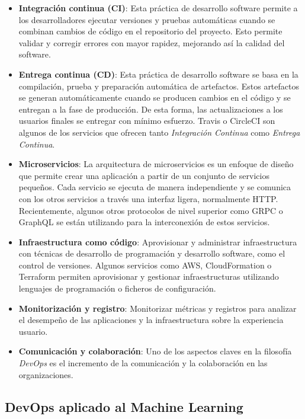 \documentclass[
  12pt,
  a4paperpaper,
]{report}
\begin{document}
\begin{itemize}
\item
  \textbf{Integración continua (CI)}: Esta práctica de desarrollo
  software permite a los desarrolladores ejecutar versiones y pruebas
  automáticas cuando se combinan cambios de código en el repositorio del
  proyecto. Esto permite validar y corregir errores con mayor rapidez,
  mejorando así la calidad del software.
\item
  \textbf{Entrega continua (CD)}: Esta práctica de desarrollo software
  se basa en la compilación, prueba y preparación automática de
  artefactos. Estos artefactos se generan automáticamente cuando se
  producen cambios en el código y se entregan a la fase de producción.
  De esta forma, las actualizaciones a los usuarios finales se entregar
  con mínimo esfuerzo. Travis o CircleCI son algunos de los servicios
  que ofrecen tanto \emph{Integración Continua} como \emph{Entrega
  Continua}.
\item
  \textbf{Microservicios}: La arquitectura de microservicios es un
  enfoque de diseño que permite crear una aplicación a partir de un
  conjunto de servicios pequeños. Cada servicio se ejecuta de manera
  independiente y se comunica con los otros servicios a través una
  interfaz ligera, normalmente HTTP. Recientemente, algunos otros
  protocolos de nivel superior como GRPC o GraphQL se están utilizando
  para la interconexión de estos servicios.
\item
  \textbf{Infraestructura como código}: Aprovisionar y administrar
  infraestructura con técnicas de desarrollo de programación y
  desarrollo software, como el control de versiones. Algunos servicios
  como AWS, CloudFormation o Terraform permiten aprovisionar y gestionar
  infraestructuras utilizando lenguajes de programación o ficheros de
  configuración.
\item
  \textbf{Monitorización y registro}: Monitorizar métricas y registros
  para analizar el desempeño de las aplicaciones y la infraestructura
  sobre la experiencia usuario.
\item
  \textbf{Comunicación y colaboración}: Uno de los aspectos claves en la
  filosofía \emph{DevOps} es el incremento de la comunicación y la
  colaboración en las organizaciones.
\end{itemize}

\hypertarget{devops-aplicado-al-machine-learning}{%
\subsection{DevOps aplicado al Machine
Learning}\label{devops-aplicado-al-machine-learning}}
\end{document}
